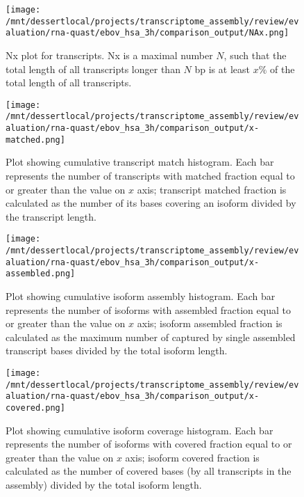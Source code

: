 \documentclass[12pt,a4paper]{article}
\begin{document}
\begin{figure}[t]
\centering
\texttt{[image: /mnt/dessertlocal/projects/transcriptome\_assembly/review/evaluation/rna-quast/ebov\_hsa\_3h/comparison\_output/NAx.png]}
\caption{Nx plot for transcripts. Nx is a maximal number $N$, such that the total length of all transcripts longer than $N$ bp is at least $x\%$ of the total length of all transcripts.}
\end{figure}
\FloatBarrier
\clearpage


\begin{figure}[t]
\centering
\texttt{[image: /mnt/dessertlocal/projects/transcriptome\_assembly/review/evaluation/rna-quast/ebov\_hsa\_3h/comparison\_output/x-matched.png]}
\caption{Plot showing cumulative transcript match histogram. Each bar represents the number of transcripts with matched fraction equal to or greater than the value on $x$ axis; transcript matched fraction is calculated as the number of its bases covering an isoform divided by the transcript length.}
\end{figure}
\FloatBarrier
\clearpage


\begin{figure}[t]
\centering
\texttt{[image: /mnt/dessertlocal/projects/transcriptome\_assembly/review/evaluation/rna-quast/ebov\_hsa\_3h/comparison\_output/x-assembled.png]}
\caption{Plot showing cumulative isoform assembly histogram. Each bar represents the number of isoforms with assembled fraction equal to or greater than the value on $x$ axis; isoform assembled fraction is calculated as the maximum number of captured by single assembled transcript bases divided by the total isoform length.}
\end{figure}
\FloatBarrier
\clearpage


\begin{figure}[t]
\centering
\texttt{[image: /mnt/dessertlocal/projects/transcriptome\_assembly/review/evaluation/rna-quast/ebov\_hsa\_3h/comparison\_output/x-covered.png]}
\caption{Plot showing cumulative isoform coverage histogram. Each bar represents the number of isoforms with covered fraction equal to or greater than the value on $x$ axis; isoform covered fraction is calculated as the number of covered bases (by all transcripts in the assembly) divided by the total isoform length.}
\end{figure}
\FloatBarrier
\clearpage
\end{document}
